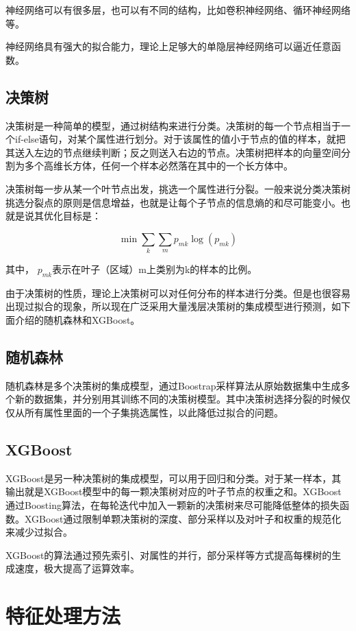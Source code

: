 神经网络可以有很多层，也可以有不同的结构，比如卷积神经网络、循环神经网络等。\cite{nndp}

神经网络具有强大的拟合能力，理论上足够大的单隐层神经网络可以逼近任意函数\cite{cybenko1989approximation}。
\subsection{决策树}
决策树\cite[311]{james2013introduction}是一种简单的模型，通过树结构来进行分类。决策树的每一个节点相当于一个if-else语句，对某个属性进行划分。对于该属性的值小于节点的值的样本，就把其送入左边的节点继续判断；反之则送入右边的节点。决策树把样本的向量空间分割为多个高维长方体，任何一个样本必然落在其中的一个长方体中。

决策树每一步从某一个叶节点出发，挑选一个属性进行分裂。一般来说分类决策树挑选分裂点的原则是信息增益，也就是让每个子节点的信息熵的和尽可能变小。也就是说其优化目标是：

\[ \min \sum_k \sum_m p_{mk}\log(p_{mk}) \]

其中， $p_{mk}$表示在叶子（区域）m上类别为k的样本的比例。

由于决策树的性质，理论上决策树可以对任何分布的样本进行分类。但是也很容易出现过拟合的现象，所以现在广泛采用大量浅层决策树的集成模型进行预测，如下面介绍的随机森林和XGBoost。

\subsection{随机森林}
随机森林\citet[p.~320]{james2013introduction}是多个决策树的集成模型，通过Boostrap采样算法从原始数据集中生成多个新的数据集，并分别用其训练不同的决策树模型。其中决策树选择分裂的时候仅仅从所有属性里面的一个子集挑选属性，以此降低过拟合的问题。
\subsection{XGBoost}
XGBoost\cite{chen2016xgboost}是另一种决策树的集成模型，可以用于回归和分类。对于某一样本，其输出就是XGBoost模型中的每一颗决策树对应的叶子节点的权重之和。XGBoost通过Boosting算法，在每轮迭代中加入一颗新的决策树来尽可能降低整体的损失函数。XGBoost通过限制单颗决策树的深度、部分采样以及对叶子和权重的规范化来减少过拟合。

XGBoost的算法通过预先索引、对属性的并行，部分采样等方式提高每棵树的生成速度，极大提高了运算效率。

\section{特征处理方法}

